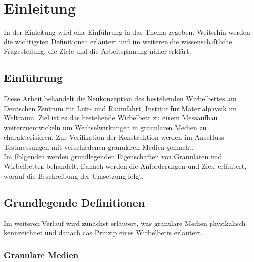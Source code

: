 \chapter{Einleitung}

In der Einleitung wird eine Einführung in das Thema gegeben. Weiterhin werden die wichtigsten Definitionen erläutert und im weiteren die wissenschaftliche Fragestellung, die Ziele und die Arbeitsplanung näher erklärt.

\section{Einführung}

Diese Arbeit behandelt die Neukonzeption des bestehenden Wirbelbettes am Deutschen Zentrum für Luft- und Raumfahrt, Institut für Materialphysik im Weltraum. Ziel ist es das bestehende Wirbelbett zu einem Messaufbau weiterzuentwickeln um Wechselwirkungen in granularen Medien zu charakterisieren. Zur Verifikation der Konstruktion werden im Anschluss Testmessungen mit verschiedenen granularen Medien gemacht. \\
Im Folgenden werden grundlegenden Eigenschaften von Granulaten und Wirbelbetten behandelt. Danach werden die Anforderungen und Ziele erläutert, worauf die Beschreibung der Umsetzung folgt.


\section{Grundlegende Definitionen}

Im weiteren Verlauf wird zunächst erläutert, was granulare Medien physikalisch kennzeichnet und danach das Prinzip eines Wirbelbetts erläutert.

\subsection{Granulare Medien}

